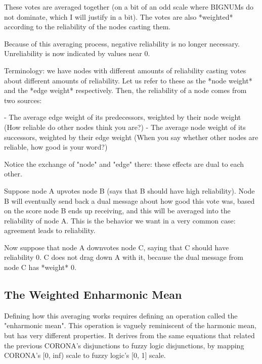 These votes are averaged together (on a bit of an odd scale where BIGNUMs do
not dominate, which I will justify in a bit). The votes are also *weighted*
according to the reliability of the nodes casting them.

Because of this averaging process, negative reliability is no longer necessary.
Unreliability is now indicated by values near 0.

Terminology: we have nodes with different amounts of reliability casting votes
about different amounts of reliability. Let us refer to these as the *node
weight* and the *edge weight* respectively. Then, the reliability of a node
comes from two sources:

- The average edge weight of its predecessors, weighted by their node weight
  (How reliable do other nodes think you are?)
- The average node weight of its successors, weighted by their edge weight
  (When you say whether other nodes are reliable, how good is your word?)

Notice the exchange of "node" and "edge" there: these effects are dual to each
other. 

Suppose node A upvotes node B (says that B should have high reliability). Node
B will eventually send back a dual message about how good this vote was, based
on the score node B ends up receiving, and this will be averaged into the
reliability of node A. This is the behavior we want in a very common case:
agreement leads to reliability.

Now suppose that node A downvotes node C, saying that C should have reliability
0. C does not drag down A with it, because the dual message from node C has
*weight* 0.

\subsection{The Weighted Enharmonic Mean}

Defining how this averaging works requires defining an operation called the
"enharmonic mean". This operation is vaguely reminiscent of the harmonic mean,
but has very different properties. It derives from the same equations that
related the previous CORONA's disjunctions to fuzzy logic disjunctions, by
mapping CORONA's [0, inf) scale to fuzzy logic's [0, 1] scale.


